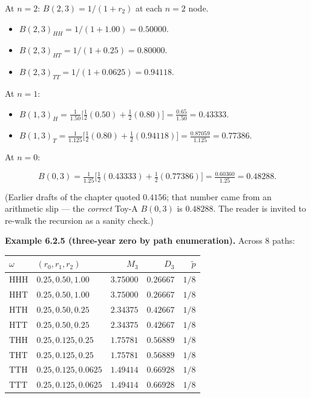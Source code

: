 \documentclass[
  10pt,
  twoside]{book}
\newcounter{none} %
\providecommand{\tightlist}{%
  \setlength{\itemsep}{0pt}\setlength{\parskip}{0pt}}
\begin{document}
At \(n = 2\): \(B(2, 3) = 1/(1 + r_2)\) at each \(n=2\) node.

\begin{itemize}
\tightlist
\item
  \(B(2, 3)_{HH} = 1/(1 + 1.00) = 0.50000\).
\item
  \(B(2, 3)_{HT} = 1/(1 + 0.25) = 0.80000\).
\item
  \(B(2, 3)_{TT} = 1/(1 + 0.0625) = 0.94118\).
\end{itemize}

At \(n = 1\):

\begin{itemize}
\tightlist
\item
  \(B(1, 3)_H = \tfrac{1}{1.50}\bigl[\tfrac{1}{2}(0.50) + \tfrac{1}{2}(0.80)\bigr] = \tfrac{0.65}{1.50} = 0.43333\).
\item
  \(B(1, 3)_T = \tfrac{1}{1.125}\bigl[\tfrac{1}{2}(0.80) + \tfrac{1}{2}(0.94118)\bigr] = \tfrac{0.87059}{1.125} = 0.77386\).
\end{itemize}

At \(n = 0\):

\[B(0, 3) = \tfrac{1}{1.25}\bigl[\tfrac{1}{2}(0.43333) + \tfrac{1}{2}(0.77386)\bigr] = \tfrac{0.60360}{1.25} = 0.48288.\]

(Earlier drafts of the chapter quoted \(0.4156\); that number came from
an arithmetic slip --- the \emph{correct} Toy-A \(B(0,3)\) is
\(0.48288\). The reader is invited to re-walk the recursion as a sanity
check.)

\textbf{Example 6.2.5 (three-year zero by path enumeration).} Across 8
paths:

{\def\LTcaptype{none} %
\begin{table}[H]
\centering
\begin{tabular}{|l|l|r|r|r|}
\toprule
\(\omega\) & \((r_0, r_1, r_2)\) & \(M_3\) & \(D_3\) & \(\tilde p\) \\
\midrule



HHH & \(0.25, 0.50, 1.00\) & \(3.75000\) & \(0.26667\) & \(1/8\) \\
HHT & \(0.25, 0.50, 1.00\) & \(3.75000\) & \(0.26667\) & \(1/8\) \\
HTH & \(0.25, 0.50, 0.25\) & \(2.34375\) & \(0.42667\) & \(1/8\) \\
HTT & \(0.25, 0.50, 0.25\) & \(2.34375\) & \(0.42667\) & \(1/8\) \\
THH & \(0.25, 0.125, 0.25\) & \(1.75781\) & \(0.56889\) & \(1/8\) \\
THT & \(0.25, 0.125, 0.25\) & \(1.75781\) & \(0.56889\) & \(1/8\) \\
TTH & \(0.25, 0.125, 0.0625\) & \(1.49414\) & \(0.66928\) & \(1/8\) \\
TTT & \(0.25, 0.125, 0.0625\) & \(1.49414\) & \(0.66928\) & \(1/8\) \\
\bottomrule
\end{tabular}
\end{table}
}
\end{document}
